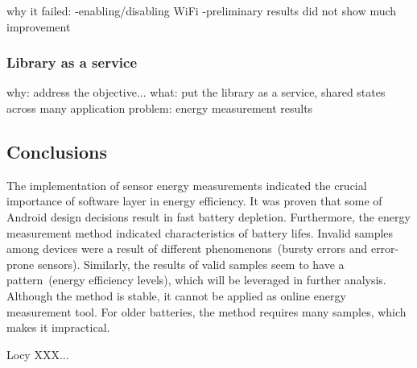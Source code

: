 why it failed:
	-enabling/disabling WiFi 
	-preliminary results did not show much improvement

\subsubsection{Library as a service}
why: address the objective...
what: put the library as a service, shared states across many application
problem: energy measurement results	


\subsection{Conclusions}
The implementation of sensor energy measurements indicated the crucial importance of software layer in energy efficiency. It was proven that some of Android design decisions result in fast battery depletion. Furthermore, the energy measurement method indicated characteristics of battery lifes. Invalid samples among devices were a result of different phenomenons\ (bursty errors and error-prone sensors). Similarly, the results of valid samples seem to have a pattern\ (energy efficiency levels), which will be leveraged in further analysis. Although the method is stable, it cannot be applied as online energy measurement tool. For older batteries, the method requires many samples, which makes it impractical.

Locy XXX...